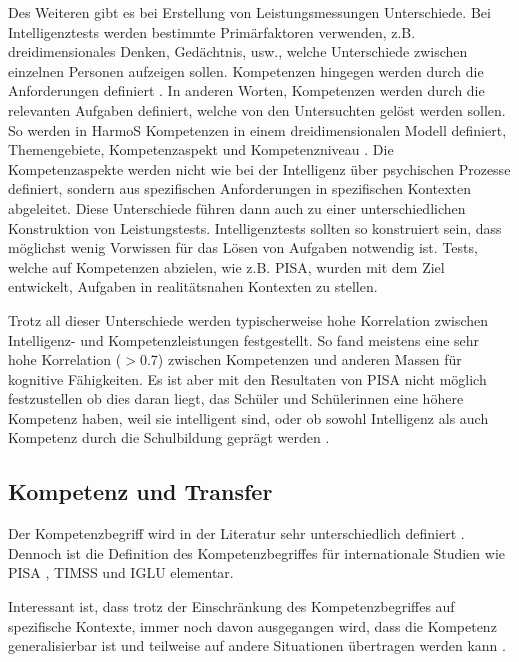 Des Weiteren gibt es bei Erstellung von Leistungsmessungen Unterschiede. Bei Intelligenztests werden bestimmte Primärfaktoren verwenden, z.B. dreidimensionales Denken, Gedächtnis, usw., welche Unterschiede zwischen einzelnen Personen aufzeigen sollen. Kompetenzen hingegen werden durch die Anforderungen definiert \citep{Rychen}. In anderen Worten, Kompetenzen werden durch die relevanten Aufgaben definiert, welche von den Untersuchten gelöst werden sollen. So werden in HarmoS Kompetenzen in einem dreidimensionalen Modell definiert, Themengebiete, Kompetenzaspekt und Kompetenzniveau \citep{KonsotriumHarmoSNaturwissenschaften+2010}. Die Kompetenzaspekte werden nicht wie bei der Intelligenz über psychischen Prozesse definiert, sondern aus spezifischen Anforderungen in spezifischen Kontexten abgeleitet. Diese Unterschiede führen dann auch zu einer unterschiedlichen Konstruktion von Leistungstests. Intelligenztests sollten so konstruiert sein, dass möglichst wenig Vorwissen für das Lösen von Aufgaben notwendig ist. Tests, welche auf Kompetenzen abzielen, wie z.B. PISA, wurden mit dem Ziel entwickelt, Aufgaben in realitätsnahen  Kontexten zu stellen. 

Trotz all dieser Unterschiede werden typischerweise hohe Korrelation zwischen Intelligenz- und Kompetenzleistungen festgestellt. So fand \citet{Rindermann2006} meistens eine sehr hohe Korrelation ($ > $0.7) zwischen Kompetenzen und anderen Massen für kognitive Fähigkeiten. Es ist aber mit den Resultaten von PISA nicht möglich festzustellen ob dies daran liegt, das Schüler und Schülerinnen eine höhere Kompetenz haben, weil sie intelligent sind, oder ob sowohl Intelligenz als auch Kompetenz durch die Schulbildung geprägt werden \citep{Hartig2006}.



\subsection{Kompetenz und Transfer}
Der Kompetenzbegriff wird in der Literatur sehr unterschiedlich definiert \citep{Klieme2004, Weinert2001b}. Dennoch ist die Definition des Kompetenzbegriffes für internationale Studien wie PISA \citep{PISA-KonsortiumDeuschland2004}, TIMSS \citep{Martin2003} und IGLU \citep{Bos2003} elementar.


Interessant ist, dass trotz der Einschränkung des Kompetenzbegriffes auf spezifische Kontexte, immer noch davon ausgegangen wird, dass die Kompetenz generalisierbar ist und teilweise auf andere Situationen übertragen werden kann \citet{Hartig2006}.

